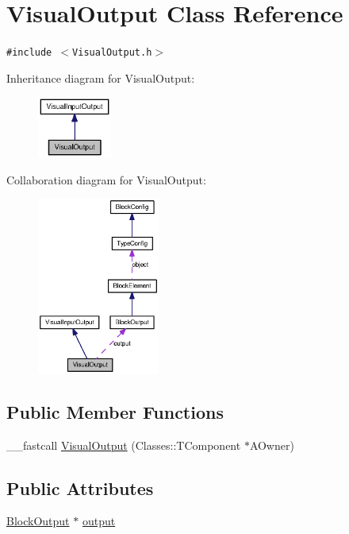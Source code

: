 \hypertarget{classVisualOutput}{
\section{VisualOutput Class Reference}
\label{classVisualOutput}
}
{\tt \#include $<$VisualOutput.h$>$}

Inheritance diagram for VisualOutput:\nopagebreak
\begin{figure}[H]
\begin{center}
\leavevmode
\includegraphics[width=69pt]{classVisualOutput__inherit__graph}
\end{center}
\end{figure}
Collaboration diagram for VisualOutput:\nopagebreak
\begin{figure}[H]
\begin{center}
\leavevmode
\includegraphics[width=114pt]{classVisualOutput__coll__graph}
\end{center}
\end{figure}
\subsection*{Public Member Functions}
\begin{CompactItemize}
\item 
\_\-\_\-fastcall \hyperlink{classVisualOutput_f194cf1b45bd799a81ffa0220653a161}{VisualOutput} (Classes::TComponent $\ast$AOwner)
\end{CompactItemize}
\subsection*{Public Attributes}
\begin{CompactItemize}
\item 
\hyperlink{classBlockOutput}{BlockOutput} $\ast$ \hyperlink{classVisualOutput_1514ca043572331039b22002581a22f8}{output}
\end{CompactItemize}



